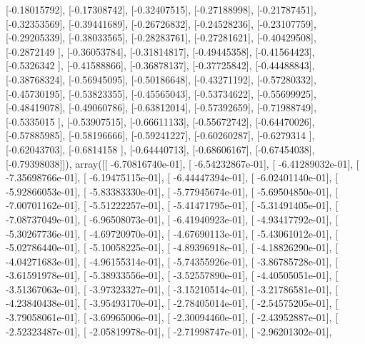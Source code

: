 \documentclass{article}
\begin{document}
       [-0.18015792],
       [-0.17308742],
       [-0.32407515],
       [-0.27188998],
       [-0.21787451],
       [-0.32353569],
       [-0.39441689],
       [-0.26726832],
       [-0.24528236],
       [-0.23107759],
       [-0.29205339],
       [-0.38033565],
       [-0.28283761],
       [-0.27281621],
       [-0.40429508],
       [-0.2872149 ],
       [-0.36053784],
       [-0.31814817],
       [-0.49445358],
       [-0.41564423],
       [-0.5326342 ],
       [-0.41588866],
       [-0.36878137],
       [-0.37725842],
       [-0.44488843],
       [-0.38768324],
       [-0.56945095],
       [-0.50186648],
       [-0.43271192],
       [-0.57280332],
       [-0.45730195],
       [-0.53823355],
       [-0.45565043],
       [-0.53734622],
       [-0.55699925],
       [-0.48419078],
       [-0.49060786],
       [-0.63812014],
       [-0.57392659],
       [-0.71988749],
       [-0.5335015 ],
       [-0.53907515],
       [-0.66611133],
       [-0.55672742],
       [-0.64470026],
       [-0.57885985],
       [-0.58196666],
       [-0.59241227],
       [-0.60260287],
       [-0.6279314 ],
       [-0.62043703],
       [-0.6814158 ],
       [-0.64440713],
       [-0.68606167],
       [-0.67454038],
       [-0.79398038]]), array([[ -6.70816740e-01],
       [ -6.54232867e-01],
       [ -6.41289032e-01],
       [ -7.35698766e-01],
       [ -6.19475115e-01],
       [ -6.44447394e-01],
       [ -6.02401140e-01],
       [ -5.92866053e-01],
       [ -5.83383330e-01],
       [ -5.77945674e-01],
       [ -5.69504850e-01],
       [ -7.00701162e-01],
       [ -5.51222257e-01],
       [ -5.41471795e-01],
       [ -5.31491405e-01],
       [ -7.08737049e-01],
       [ -6.96508073e-01],
       [ -6.41940923e-01],
       [ -4.93417792e-01],
       [ -5.30267736e-01],
       [ -4.69720970e-01],
       [ -4.67690113e-01],
       [ -5.43061012e-01],
       [ -5.02786440e-01],
       [ -5.10058225e-01],
       [ -4.89396918e-01],
       [ -4.18826290e-01],
       [ -4.04271683e-01],
       [ -4.96155314e-01],
       [ -5.74355926e-01],
       [ -3.86785728e-01],
       [ -3.61591978e-01],
       [ -5.38933556e-01],
       [ -3.52557890e-01],
       [ -4.40505051e-01],
       [ -3.51367063e-01],
       [ -3.97323327e-01],
       [ -3.15210514e-01],
       [ -3.21786581e-01],
       [ -4.23840438e-01],
       [ -3.95493170e-01],
       [ -2.78405014e-01],
       [ -2.54575205e-01],
       [ -3.79058061e-01],
       [ -3.69965006e-01],
       [ -2.30094460e-01],
       [ -2.43952887e-01],
       [ -2.52323487e-01],
       [ -2.05819978e-01],
       [ -2.71998747e-01],
       [ -2.96201302e-01],
\end{document}
